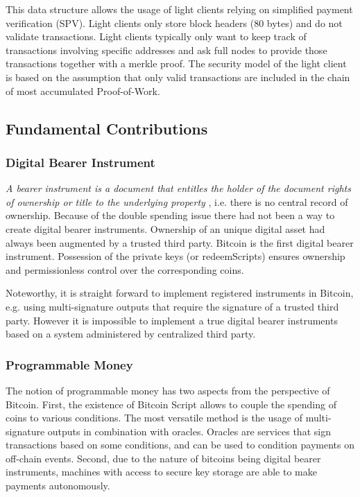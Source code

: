   This data structure allows the usage of light clients relying on simplified payment verification (SPV). Light clients only store block headers (80 bytes) and do not validate transactions. Light clients typically only want to keep track of transactions involving specific addresses and ask full nodes to provide those transactions together with a merkle proof. The security model of the light client is based on the assumption that only valid transactions are included in the chain of most accumulated Proof-of-Work.  
 

\subsection{Fundamental Contributions}
\label{sec:btc_cont}

\subsubsection{Digital Bearer Instrument}

\emph{A bearer instrument is a document that entitles the holder of the document rights of ownership or title to the underlying property} \cite{bearer}, i.e. there is no central record of ownership. Because of the double spending issue there had not been a way to create digital bearer instruments. Ownership of an unique digital asset had always been augmented by a trusted third party. Bitcoin is the first digital bearer instrument. Possession of the private keys (or redeemScripts) ensures ownership and permissionless control over the corresponding coins.

Noteworthy, it is straight forward to implement registered instruments in Bitcoin, e.g. using multi-signature outputs that require the signature of a trusted third party. However it is impossible to implement a true digital bearer instruments based on a system administered by centralized third party.

\subsubsection{Programmable Money}

The notion of programmable money has two aspects from the perspective of Bitcoin. First, the existence of Bitcoin Script allows to couple the spending of coins to various conditions. The most versatile method is the usage of multi-signature outputs in combination with oracles. Oracles are services that sign transactions based on some conditions, and can be used to condition payments on off-chain events. Second, due to the nature of bitcoins being digital bearer instruments, machines with access to secure key storage are able to make payments autonomously.  

